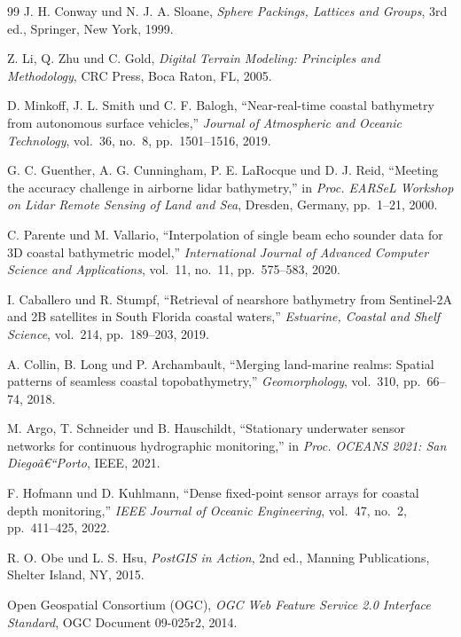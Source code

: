 ﻿\documentclass[a4paper,12pt]{article}
\theoremstyle{definition}
\begin{document}
\begin{thebibliography}{99}
J. H. Conway und N. J. A. Sloane,
\textit{Sphere Packings, Lattices and Groups}, 3rd ed.,
Springer, New York, 1999.

Z. Li, Q. Zhu und C. Gold,
\textit{Digital Terrain Modeling: Principles and Methodology},
CRC Press, Boca Raton, FL, 2005.

D. Minkoff, J. L. Smith und C. F. Balogh,
``Near-real-time coastal bathymetry from autonomous surface vehicles,''
\textit{Journal of Atmospheric and Oceanic Technology}, vol.~36, no.~8,
pp.~1501--1516, 2019.

G. C. Guenther, A. G. Cunningham, P. E. LaRocque und D. J. Reid,
``Meeting the accuracy challenge in airborne lidar bathymetry,''
in \textit{Proc. EARSeL Workshop on Lidar Remote Sensing of Land and Sea},
Dresden, Germany, pp.~1--21, 2000.

C. Parente und M. Vallario,
``Interpolation of single beam echo sounder data for 3D coastal bathymetric model,''
\textit{International Journal of Advanced Computer Science and Applications},
vol.~11, no.~11, pp.~575--583, 2020.

I. Caballero und R. Stumpf,
``Retrieval of nearshore bathymetry from Sentinel-2A and 2B satellites
in South Florida coastal waters,''
\textit{Estuarine, Coastal and Shelf Science}, vol.~214, pp.~189--203, 2019.

A. Collin, B. Long und P. Archambault,
``Merging land-marine realms: Spatial patterns of seamless coastal
topobathymetry,''
\textit{Geomorphology}, vol.~310, pp.~66--74, 2018.

M. Argo, T. Schneider und B. Hauschildt,
``Stationary underwater sensor networks for continuous hydrographic monitoring,''
in \textit{Proc. OCEANS 2021: San Diegoâ€“Porto}, IEEE, 2021.

F. Hofmann und D. Kuhlmann,
``Dense fixed-point sensor arrays for coastal depth monitoring,''
\textit{IEEE Journal of Oceanic Engineering}, vol.~47, no.~2,
pp.~411--425, 2022.

R. O. Obe und L. S. Hsu,
\textit{PostGIS in Action}, 2nd ed.,
Manning Publications, Shelter Island, NY, 2015.

Open Geospatial Consortium (OGC),
\textit{OGC Web Feature Service 2.0 Interface Standard},
OGC Document 09-025r2, 2014.


\end{thebibliography}
\end{document}
